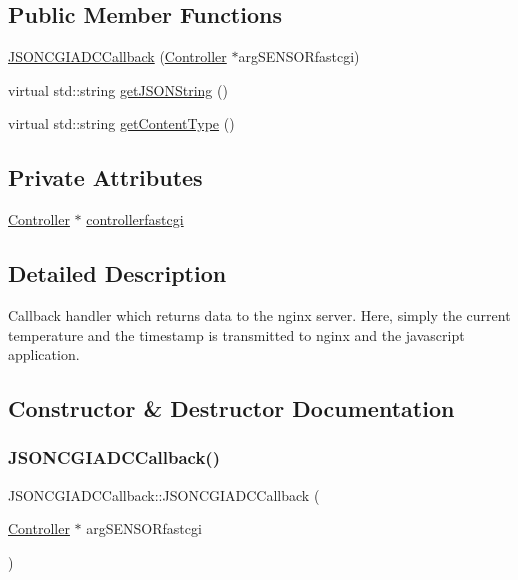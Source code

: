 \subsection*{Public Member Functions}
\begin{DoxyCompactItemize}
\item 
\hyperlink{classJSONCGIADCCallback_abb5598a6c6563d00f8ede0b2bb87c2bc}{J\+S\+O\+N\+C\+G\+I\+A\+D\+C\+Callback} (\hyperlink{classController}{Controller} $\ast$arg\+S\+E\+N\+S\+O\+Rfastcgi)
\item 
virtual std\+::string \hyperlink{classJSONCGIADCCallback_a763ae66809e399f49e712a1ad68289bb}{get\+J\+S\+O\+N\+String} ()
\item 
virtual std\+::string \hyperlink{classJSONCGIHandler_1_1GETCallback_a4e1fee495ddeb4e24eaa5b8e767ea838}{get\+Content\+Type} ()
\end{DoxyCompactItemize}
\subsection*{Private Attributes}
\begin{DoxyCompactItemize}
\item 
\hyperlink{classController}{Controller} $\ast$ \hyperlink{classJSONCGIADCCallback_a3f832c3bdcddd67e1ab4daa225531b2e}{controllerfastcgi}
\end{DoxyCompactItemize}


\subsection{Detailed Description}
Callback handler which returns data to the nginx server. Here, simply the current temperature and the timestamp is transmitted to nginx and the javascript application. 

\subsection{Constructor \& Destructor Documentation}
\mbox{\label{classJSONCGIADCCallback_abb5598a6c6563d00f8ede0b2bb87c2bc}} 
\subsubsection{\texorpdfstring{J\+S\+O\+N\+C\+G\+I\+A\+D\+C\+Callback()}{JSONCGIADCCallback()}}
{\footnotesize\ttfamily J\+S\+O\+N\+C\+G\+I\+A\+D\+C\+Callback\+::\+J\+S\+O\+N\+C\+G\+I\+A\+D\+C\+Callback (\begin{DoxyParamCaption}\item[{\hyperlink{classController}{Controller} $\ast$}]{arg\+S\+E\+N\+S\+O\+Rfastcgi }\end{DoxyParamCaption})\hspace{0.3cm}{\ttfamily [inline]}}

